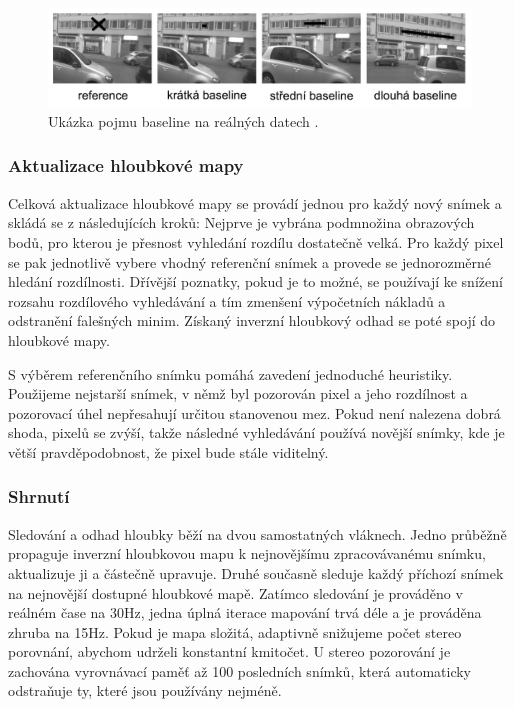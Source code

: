 \documentclass[12pt,a4paper]{article}
\begin{document}
\begin{figure}[H]
\centering
\includegraphics[scale=0.4]{img/baseline.jpg}
\caption{Ukázka pojmu baseline na reálných datech \cite{Semi-Dense_VO}.}
\end{figure}

\subsubsection*{Aktualizace hloubkové mapy}
Celková aktualizace hloubkové mapy se provádí jednou pro každý nový snímek a skládá se z následujících kroků: Nejprve je vybrána podmnožina obrazových bodů, pro kterou je přesnost vyhledání rozdílu dostatečně velká. Pro každý pixel se pak jednotlivě vybere vhodný referenční snímek a provede se jednorozměrné hledání rozdílnosti. Dřívější poznatky, pokud je to možné, se používají ke snížení rozsahu rozdílového vyhledávání a tím zmenšení výpočetních nákladů a odstranění falešných minim. Získaný inverzní hloubkový odhad se poté spojí do hloubkové mapy.

S výběrem referenčního snímku pomáhá zavedení jednoduché heuristiky. Použijeme nejstarší snímek, v němž byl pozorován pixel a jeho rozdílnost a pozorovací úhel nepře\-sahují určitou stanovenou mez. Pokud není nalezena dobrá shoda,  pixelů se zvýší, takže následné vyhledávání používá novější snímky, kde je větší pravděpodobnost, že pixel bude stále viditelný.


\subsubsection*{Shrnutí}
Sledování a odhad hloubky běží na dvou samostatných vláknech. Jedno průběžně propaguje inverzní hloubkovou mapu k nejnovějšímu zpracovávanému snímku, aktualizuje ji a částečně upravuje. Druhé současně sleduje každý příchozí snímek na nejnovější dostupné hloubkové mapě. Zatímco sledování je prováděno v reálném čase na 30Hz, jedna úplná iterace mapování trvá déle a je prováděna zhruba na 15Hz. Pokud je mapa složitá, adaptivně snižujeme počet stereo porovnání, abychom udrželi konstantní kmitočet. U stereo pozorování je zachována vyrovnávací paměť až 100 posledních snímků, která automaticky odstraňuje ty, které jsou používány nejméně.
\end{document}
